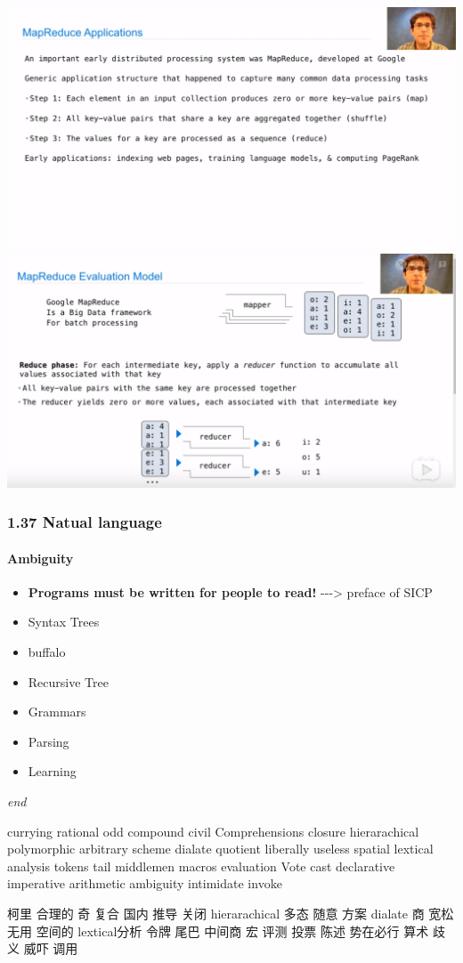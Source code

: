 \documentclass[11pt]{article}
\makeatletter
\def\maxwidth{\ifdim\Gin@nat@width>\linewidth\linewidth
    \else\Gin@nat@width\fi}
\let\Oldincludegraphics\includegraphics
\renewcommand{\includegraphics}[1]{\Oldincludegraphics[width=.8\maxwidth]{#1}}
\providecommand{\tightlist}{%
      \setlength{\itemsep}{0pt}\setlength{\parskip}{0pt}}
\makeatother
\begin{document}
\includegraphics{./image/MapReduceApp.png}
\includegraphics{./image/MpRe-model.png}

    \subsubsection{1.37 Natual language}\label{natual-language}

\paragraph{Ambiguity}\label{ambiguity}

\begin{itemize}
\tightlist
\item
  \textbf{Programs must be written for people to read!}
  -\/-\/-\textgreater{} preface of SICP
\item
  Syntax Trees
\item
  buffalo
\item
  Recursive Tree
\item
  Grammars
\item
  Parsing
\item
  Learning
\end{itemize}

    \emph{end}

    currying rational odd compound civil Comprehensions closure
hierarachical polymorphic arbitrary scheme dialate quotient liberally
useless spatial lextical analysis tokens tail middlemen macros
evaluation Vote cast declarative imperative arithmetic ambiguity
intimidate invoke

柯里 合理的 奇 复合 国内 推导 关闭 hierarachical 多态 随意 方案 dialate
商 宽松 无用 空间的 lextical分析 令牌 尾巴 中间商 宏 评测 投票 陈述
势在必行 算术 歧义 威吓 调用


    
    
    
    
\end{document}
